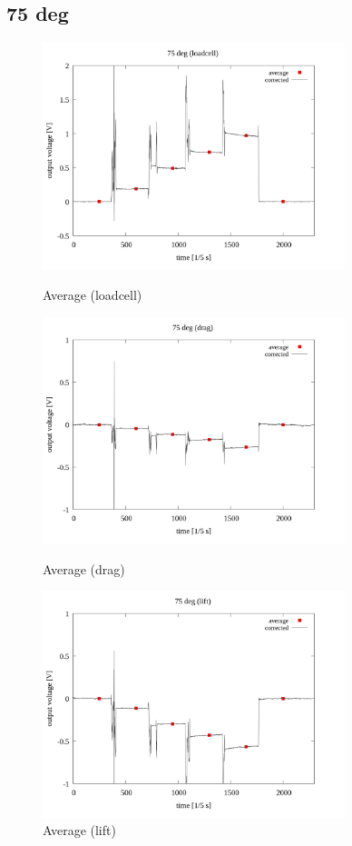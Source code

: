 \documentclass[twocolumn,a4j]{jsarticle}
\begin{document}
\newpage
\subsection{75 deg}
\begin{figure}[htbp]
    \footnotesize
    \begin{center}
        \includegraphics[width=88mm]{../images/average/75_loadcell_average.png}
        \caption{Average (loadcell)}
        \includegraphics[width=88mm]{../images/average/75_drag_average.png}
        \caption{Average (drag)}
        \includegraphics[width=88mm]{../images/average/75_lift_average.png}
        \caption{Average (lift)}
    \end{center}
\end{figure}
\end{document}
